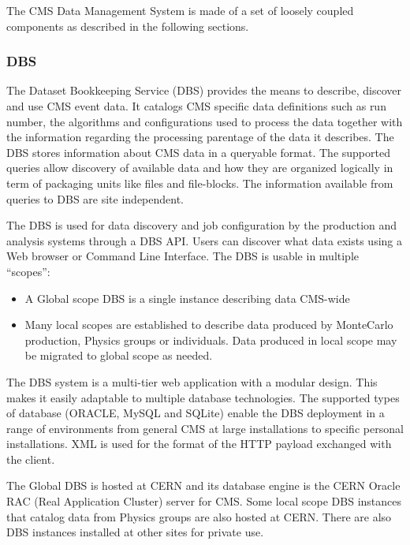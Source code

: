 The CMS Data Management System is made of a set of loosely coupled components as described in the following sections.
\subsubsection{DBS}
\label{sec:3_1_1}
The Dataset Bookkeeping Service (DBS)\cite{RefDBS} provides the means to describe, discover and use CMS event data. 
It catalogs CMS specific data definitions such as run number, the algorithms and configurations used to process the data together with the information regarding the processing parentage of the data it describes.
The DBS stores information about CMS data in a queryable format. The supported queries allow discovery of available data and how they are organized logically in term of packaging units like files and file-blocks. The information available from queries to DBS are site independent.

The DBS is used for data discovery and job configuration by the production and analysis systems through a DBS API. 
Users can discover what data exists using a Web browser or Command Line Interface.
The DBS is usable in multiple “scopes”:
\begin{itemize}
\item A Global scope DBS is a single instance describing data CMS-wide %
\item Many local scopes are established to describe data produced by MonteCarlo production, Physics groups or individuals. %
Data produced in local scope may be migrated to global scope as needed.

\end{itemize}
The DBS system is a multi-tier web application with a modular design. This makes it easily adaptable to multiple database technologies. The supported types of database (ORACLE, MySQL and SQLite) enable the DBS deployment in a range of environments from general CMS at large installations to specific personal installations.
XML is used for the format of the HTTP payload exchanged with the client.

The Global DBS is hosted at CERN and its database engine is the CERN Oracle RAC (Real Application Cluster) server for CMS. Some local scope DBS instances that catalog data from Physics groups are also hosted at CERN. There are also DBS instances installed at other sites for private use. 

